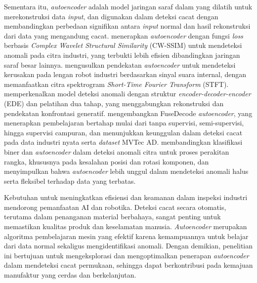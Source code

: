 Sementara itu, \textit{autoencoder} adalah model jaringan saraf dalam
yang dilatih untuk merekonstruksi data \textit{input}, dan digunakan
dalam deteksi cacat dengan membandingkan perbedaan signifikan antara
\textit{input} normal dan hasil rekonstruksi dari data yang
mengandung cacat. \citet{14} menerapkan \textit{autoencoder} dengan
fungsi \textit{loss} berbasis \textit{Complex Wavelet Structural
Similarity} (CW-SSIM)
untuk mendeteksi anomali pada citra industri, yang terbukti lebih
efisien dibandingkan jaringan saraf besar lainnya. \citet{15}
mengusulkan pendekatan \textit{autoencoder} untuk mendeteksi kerusakan
pada lengan robot industri berdasarkan sinyal suara internal, dengan
memanfaatkan citra spektrogram \textit{Short-Time Fourier Transform}
(STFT). \citet{16} memperkenalkan model
deteksi anomali dengan struktur \textit{encoder-decoder-encoder}
(EDE) dan pelatihan dua tahap, yang
menggabungkan rekonstruksi dan pendekatan konfrontasi generatif.
\citet{17} mengembangkan FuseDecode \textit{autoencoder}, yang
menerapkan pembelajaran bertahap mulai dari tanpa supervisi,
semi-supervisi, hingga supervisi campuran, dan menunjukkan keunggulan
dalam deteksi cacat pada data industri nyata serta \textit{dataset}
MVTec AD. \citet{18} membandingkan klasifikasi biner
dan \textit{autoencoder} dalam deteksi anomali citra untuk proses
perakitan rangka, khususnya pada kesalahan posisi dan rotasi komponen, dan
menyimpulkan bahwa \textit{autoencoder} lebih unggul dalam mendeteksi anomali
halus serta fleksibel terhadap data yang terbatas.

Kebutuhan untuk meningkatkan efisiensi dan keamanan dalam inspeksi
industri mendorong pemanfaatan AI dan robotika. Deteksi cacat secara
otomatis, terutama dalam penanganan material berbahaya, sangat
penting untuk memastikan kualitas produk dan keselamatan manusia.
\textit{Autoencoder} merupakan algoritma pembelajaran mesin yang
efektif karena kemampuannya untuk belajar dari data normal sekaligus
mengidentifikasi anomali.
Dengan demikian, penelitian ini bertujuan untuk mengeksplorasi dan
mengoptimalkan penerapan \textit{autoencoder} dalam mendeteksi cacat
permukaan, sehingga dapat berkontribusi pada kemajuan manufaktur yang
cerdas dan berkelanjutan.

\vspace{1em}

